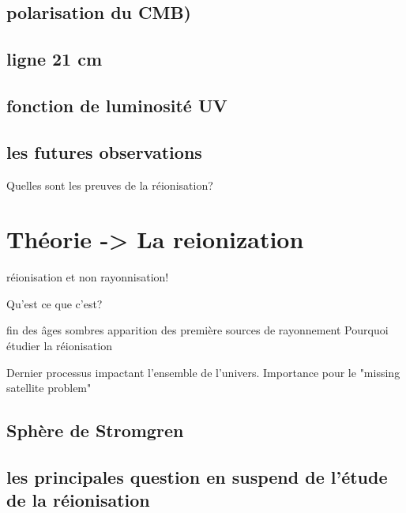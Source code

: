 \subsection{polarisation du CMB)}

\subsection{ligne 21 cm}

\subsection{fonction de luminosité UV}


\subsection{les futures observations}

Quelles sont les preuves de la réionisation?

\section{Théorie -> La reionization}

réionisation et non rayonnisation!

Qu'est ce que c'est?

fin des âges sombres
apparition des première sources de rayonnement
Pourquoi étudier la réionisation

Dernier processus impactant l'ensemble de l'univers.
Importance pour le "missing satellite problem"

\subsection{Sphère de Stromgren}


\subsection{les principales question en suspend de l'étude de la réionisation}

